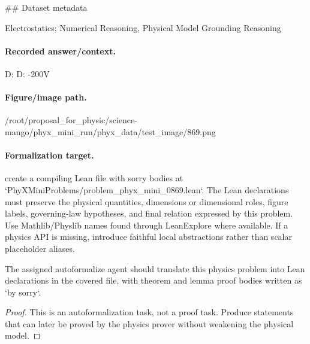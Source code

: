 \#\# Dataset metadata

Electrostatics; Numerical Reasoning, Physical Model Grounding Reasoning

\paragraph{Recorded answer/context.}
D: D: -200V

\paragraph{Figure/image path.}
/root/proposal\_for\_physic/science-mango/phyx\_mini\_run/phyx\_data/test\_image/869.png

\paragraph{Formalization target.}
create a compiling Lean file with sorry bodies at `PhyXMiniProblems/problem\_phyx\_mini\_0869.lean`. The Lean declarations must preserve the physical quantities, dimensions or dimensional roles, figure labels, governing-law hypotheses, and final relation expressed by this problem.
Use Mathlib/Physlib names found through LeanExplore where available. If a physics API is missing, introduce faithful local abstractions rather than scalar placeholder aliases.

\begin{theorem}
\label{thm:physics:phyx_mini_0869:target}
The assigned autoformalize agent should translate this physics problem into Lean declarations in the covered file, with theorem and lemma proof bodies written as `by sorry`.
\end{theorem}
\begin{proof}
This is an autoformalization task, not a proof task. Produce statements that can later be proved by the physics prover without weakening the physical model.
\end{proof}

